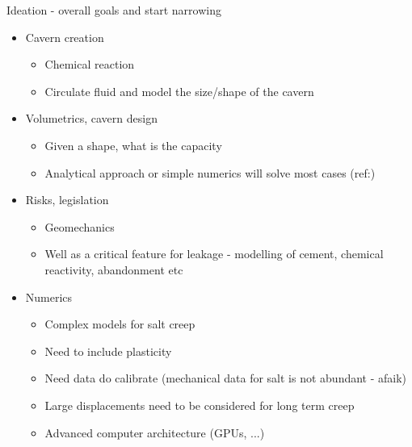 \begin{frame}{Ideation - overall goals and start narrowing}
\begin{itemize}
\item Cavern creation
	\begin{itemize}
	\item Chemical reaction
	\item Circulate fluid and model the size/shape of the cavern
	\end{itemize}
\item Volumetrics, cavern design
	\begin{itemize}
	\item Given a shape, what is the capacity
	\item Analytical approach or simple numerics will solve most cases (ref:\cite{maraggi23})
	\end{itemize}
\item Risks, legislation
	\begin{itemize}
	\item Geomechanics
	\item Well as a critical feature for leakage - modelling of cement, chemical reactivity, abandonment etc
	\end{itemize}
\item Numerics
	\begin{itemize}
	\item Complex models for salt creep
	\item Need to include plasticity
	\item Need data do calibrate (mechanical data for salt is not abundant - afaik)
	\item Large displacements need to be considered for long term creep
	\item Advanced computer architecture (GPUs, ...)
	\end{itemize}
\end{itemize}
\end{frame}


